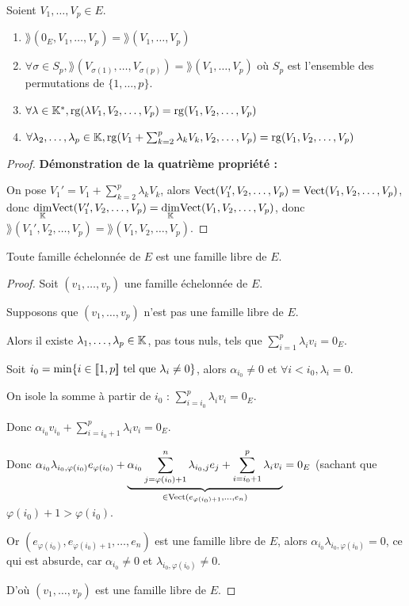 \documentclass[12pt,a4paper]{report}
\begin{document}
\begin{property}
    Soient $V_1,\dots,V_p \in E$.

    \begin{enumerate}
        \item $\rang(0_E,V_1,\dots,V_p) = \rang(V_1,\dots,V_p)$
        \item $\forall \sigma \in S_p, \rang(V_{\sigma(1)},\dots,V_{\sigma(p)}) = \rang(V_1,\dots,V_p)$ où $S_p$ est l'ensemble des permutations de $\{1,\dots,p\}$.
        \item $\forall \lambda \in \mathbb{K}^*, \mathrm{rg}(\lambda V_1,V_2,\dots,V_p) = \mathrm{rg}(V_1,V_2,\dots,V_p)$
        \item $\forall \lambda_2,\dots,\lambda_p \in \mathbb{K}, \mathrm{rg}(V_1 + \sum_{k=2}^p \lambda_k V_k, V_2,\dots,V_p) = \mathrm{rg}(V_1,V_2,\dots,V_p)$
    \end{enumerate}
\end{property}

\begin{proof}
    \textbf{Démonstration de la quatrième propriété :}

    On pose $V_1' = V_1 + \sum_{k=2}^p \lambda_k V_k$, alors $\mathrm{Vect}(V_1',V_2,\dots,V_p) = \mathrm{Vect}(V_1,V_2,\dots,V_p)$, donc $\underset{\mathbb{K}}\dim \mathrm{Vect}(V_1',V_2,\dots,V_p) = \underset{\mathbb{K}}\dim \mathrm{Vect}(V_1,V_2,\dots,V_p)$, donc $\rang(V_1',V_2,\dots,V_p) = \rang(V_1,V_2,\dots,V_p)$.
\end{proof}

\begin{property}
    Toute famille échelonnée de $E$ est une famille libre de $E$.
\end{property}

\begin{proof}
    Soit $(v_1,\dots,v_p)$ une famille échelonnée de $E$.

    Supposons que $(v_1,\dots,v_p)$ n'est pas une famille libre de $E$.
    
    Alors il existe $\lambda_1,\dots,\lambda_p \in \mathbb{K}$, pas tous nuls, tels que $\sum_{i=1}^p \lambda_i v_i = 0_E$.

    Soit $i_0 = \min\{i \in [\![1,p]\!] \text{ tel que } \lambda_i \ne 0\}$, alors $\alpha_{i_0} \ne 0$ et $\forall i < i_0, \lambda_i = 0$.

    On isole la somme à partir de $i_0$ : $\sum_{i=i_0}^p \lambda_i v_i = 0_E$.

    Donc $\alpha_{i_0} v_{i_0} + \sum_{i=i_0+1}^p \lambda_i v_i = 0_E$.

    Donc $\alpha_{i_0} \lambda_{i_0,\varphi(i_0)} e_{\varphi(i_0)} + \underbrace{\alpha_{i_0} \sum_{j=\varphi(i_0)+1}^n \lambda_{i_0,j} e_j + \sum_{i=i_0+1}^p \lambda_i v_i}_{\in \mathrm{Vect}(e_{\varphi(i_0)+1},\dots,e_n)} = 0_E$ (sachant que $\varphi(i_0) + 1 > \varphi(i_0)$.

    Or $(e_{\varphi(i_0)}, e_{\varphi(i_0)+1},\dots,e_n)$ est une famille libre de $E$, alors $\alpha_{i_0} \lambda_{i_0,\varphi(i_0)} = 0$, ce qui est absurde, car $\alpha_{i_0} \ne 0$ et $\lambda_{i_0,\varphi(i_0)} \ne 0$.

    D'où $(v_1,\dots,v_p)$ est une famille libre de $E$.
\end{proof}
\end{document}
